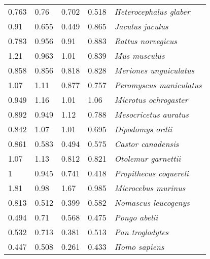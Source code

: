 \begin{tabular}{lllll}
          0.763 &            0.76 &           0.702 &           0.518 &                \textit{Heterocephalus glaber} \\
           0.91 &           0.655 &           0.449 &           0.865 &                      \textit{Jaculus jaculus} \\
          0.783 &           0.956 &            0.91 &           0.883 &                    \textit{Rattus norvegicus} \\
           1.21 &           0.963 &            1.01 &           0.839 &                         \textit{Mus musculus} \\
          0.858 &           0.856 &           0.818 &           0.828 &                \textit{Meriones unguiculatus} \\
           1.07 &            1.11 &           0.877 &           0.757 &               \textit{Peromyscus maniculatus} \\
          0.949 &            1.16 &            1.01 &            1.06 &                 \textit{Microtus ochrogaster} \\
          0.892 &           0.949 &            1.12 &           0.788 &                 \textit{Mesocricetus auratus} \\
          0.842 &            1.07 &            1.01 &           0.695 &                      \textit{Dipodomys ordii} \\
          0.861 &           0.583 &           0.494 &           0.575 &                    \textit{Castor canadensis} \\
           1.07 &            1.13 &           0.812 &           0.821 &                   \textit{Otolemur garnettii} \\
              1 &           0.945 &           0.741 &           0.418 &                \textit{Propithecus coquereli} \\
           1.81 &            0.98 &            1.67 &           0.985 &                   \textit{Microcebus murinus} \\
          0.813 &           0.512 &           0.399 &           0.582 &                  \textit{Nomascus leucogenys} \\
          0.494 &            0.71 &           0.568 &           0.475 &                         \textit{Pongo abelii} \\
          0.532 &           0.713 &           0.381 &           0.513 &                      \textit{Pan troglodytes} \\
          0.447 &           0.508 &           0.261 &           0.433 &                         \textit{Homo sapiens} \\

\end{tabular}
